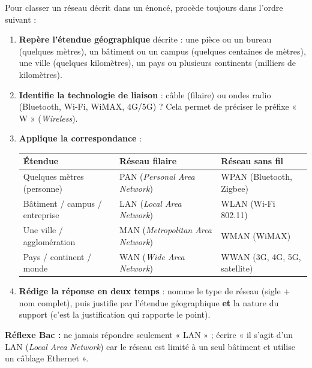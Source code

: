 \documentclass[11pt]{article}
\begin{document}
\begin{methode}
Pour classer un réseau décrit dans un énoncé, procède toujours dans l'ordre suivant :
\begin{enumerate}
  \item \textbf{Repère l'étendue géographique} décrite : une pièce ou un bureau (quelques mètres), un bâtiment ou un campus (quelques centaines de mètres), une ville (quelques kilomètres), un pays ou plusieurs continents (milliers de kilomètres).
  \item \textbf{Identifie la technologie de liaison} : câble (filaire) ou ondes radio (Bluetooth, Wi-Fi, WiMAX, 4G/5G) ? Cela permet de préciser le préfixe « W » (\emph{Wireless}).
  \item \textbf{Applique la correspondance} :
  \begin{center}
  \begin{tabularx}{\linewidth}{|l|l|X|}
  \hline
  \rowcolor{popblueL}
  \textbf{Étendue} & \textbf{Réseau filaire} & \textbf{Réseau sans fil} \\
  \hline
  Quelques mètres (personne) & PAN (\emph{Personal Area Network}) & WPAN (Bluetooth, Zigbee) \\
  \hline
  Bâtiment / campus / entreprise & LAN (\emph{Local Area Network}) & WLAN (Wi-Fi 802.11) \\
  \hline
  Une ville / agglomération & MAN (\emph{Metropolitan Area Network}) & WMAN (WiMAX) \\
  \hline
  Pays / continent / monde & WAN (\emph{Wide Area Network}) & WWAN (3G, 4G, 5G, satellite) \\
  \hline
  \end{tabularx}
  \end{center}
  \item \textbf{Rédige la réponse en deux temps} : nomme le type de réseau (sigle + nom complet), puis justifie par l'étendue géographique \textbf{et} la nature du support (c'est la justification qui rapporte le point).
\end{enumerate}
\textbf{Réflexe Bac :} ne jamais répondre seulement « LAN » ; écrire « il s'agit d'un LAN (\emph{Local Area Network}) car le réseau est limité à un seul bâtiment et utilise un câblage Ethernet ».
\end{methode}
\end{document}
